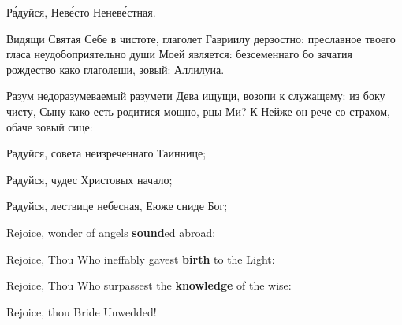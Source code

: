 
Ра́дуйся, Неве́сто Неневе́стная.


\Ierei Видящи Святая Себе в чистоте, глаголет Гавриилу дерзостно: преславное твоего гласа неудобоприятельно души Моей является: безсеменнаго бо зачатия рождество како глаголеши, зовый: Аллилуиа.


\Ierei Разум недоразумеваемый разумети Дева ищущи, возопи к служащему: из боку чисту, Сыну како есть родитися мощно, рцы Ми? К Нейже он рече со страхом, обаче зовый сице:

\KhorRaduisya Радуйся, совета неизреченнаго Таиннице;


Радуйся, чудес Христовых начало;


Радуйся, лествице небесная, Еюже сниде Бог;


\pagebreak



Rejoice, wonder of angels \textbf{sound}ed abroad:


Rejoice, Thou Who ineffably gavest \textbf{birth} to the Light:


Rejoice, Thou Who surpassest the \textbf{know}\textbf{ledge} of the wise:


Rejoice, thou Bride Unwedded!





